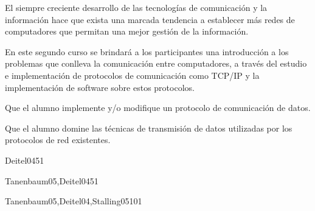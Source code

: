 \begin{syllabus}


\begin{justification}
El siempre creciente desarrollo de las tecnologías de comunicación y la
información hace que exista una marcada tendencia a  establecer
más redes de computadores que permitan una mejor
gestión de la información.

En este segundo curso se brindará a los participantes una introducción a los
problemas que conlleva la comunicación entre computadores, a través del
estudio e implementación de protocolos de comunicación como TCP/IP y
la implementación de software sobre estos protocolos.
\end{justification}

\begin{goals}
\item Que el alumno implemente y/o modifique un protocolo de comunicación de datos.
\item Que el alumno domine las técnicas de transmisión de datos utilizadas por los protocolos de red existentes.
\end{goals}

\begin{outcomes}
\end{outcomes}

\begin{unit}{\PFEventDrivenProgrammingDef}{Deitel04}{5}{1}
   \PFEventDrivenProgrammingAllTopics
   \begin{learningoutcomes}
      \item \PFEventDrivenProgrammingObjTWO
      \item \PFEventDrivenProgrammingObjTHREE
   \end{learningoutcomes}
\end{unit}

\begin{unit}{\NCNetworkSecurityDef}{Tanenbaum05,Deitel04}{5}{1}
        \NCNetworkSecurityAllTopics
        \NCNetworkSecurityAllObjectives
\end{unit}

\begin{unit}{\NCWebOrganizationDef}{Tanenbaum05,Deitel04,Stalling05}{10}{1}
        \NCWebOrganizationAllTopics
        \NCWebOrganizationAllObjectives
\end{unit}


\end{syllabus}
